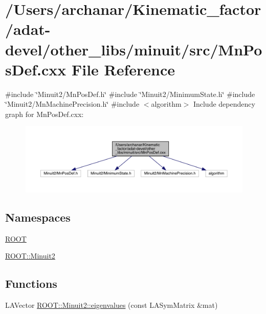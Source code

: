 \hypertarget{adat-devel_2other__libs_2minuit_2src_2MnPosDef_8cxx}{}\section{/\+Users/archanar/\+Kinematic\+\_\+factor/adat-\/devel/other\+\_\+libs/minuit/src/\+Mn\+Pos\+Def.cxx File Reference}
\label{adat-devel_2other__libs_2minuit_2src_2MnPosDef_8cxx}
{\ttfamily \#include \char`\"{}Minuit2/\+Mn\+Pos\+Def.\+h\char`\"{}}\newline
{\ttfamily \#include \char`\"{}Minuit2/\+Minimum\+State.\+h\char`\"{}}\newline
{\ttfamily \#include \char`\"{}Minuit2/\+Mn\+Machine\+Precision.\+h\char`\"{}}\newline
{\ttfamily \#include $<$algorithm$>$}\newline
Include dependency graph for Mn\+Pos\+Def.\+cxx\+:
\nopagebreak
\begin{figure}[H]
\begin{center}
\leavevmode
\includegraphics[width=350pt]{dd/d01/adat-devel_2other__libs_2minuit_2src_2MnPosDef_8cxx__incl}
\end{center}
\end{figure}
\subsection*{Namespaces}
\begin{DoxyCompactItemize}
\item 
 \mbox{\hyperlink{namespaceROOT}{R\+O\+OT}}
\item 
 \mbox{\hyperlink{namespaceROOT_1_1Minuit2}{R\+O\+O\+T\+::\+Minuit2}}
\end{DoxyCompactItemize}
\subsection*{Functions}
\begin{DoxyCompactItemize}
\item 
L\+A\+Vector \mbox{\hyperlink{namespaceROOT_1_1Minuit2_a1569bf99d4c46944433c0b5bb02b3ad6}{R\+O\+O\+T\+::\+Minuit2\+::eigenvalues}} (const L\+A\+Sym\+Matrix \&mat)
\end{DoxyCompactItemize}

